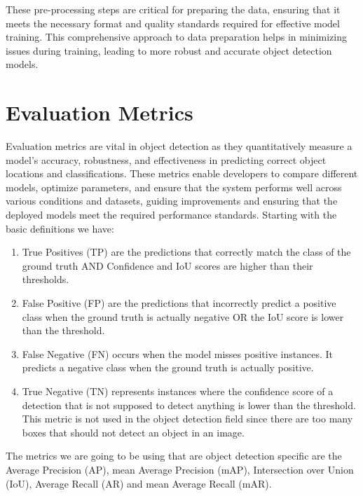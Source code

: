 These pre-processing steps are critical for preparing the data, ensuring that it meets the necessary format and quality standards required for effective 
model training. This comprehensive approach to data preparation helps in minimizing issues during training, leading to more robust and accurate object 
detection models.



\section{Evaluation Metrics}


Evaluation metrics are vital in object detection as they quantitatively measure a model's accuracy, robustness, and effectiveness in predicting correct 
object locations and classifications. These metrics enable developers to compare different models, optimize parameters, and ensure that the system performs 
well across various conditions and datasets, guiding improvements and ensuring that the deployed models meet the required performance standards. Starting 
with the basic definitions we have:

\begin{enumerate}
    \item True Positives (TP) \cite{metrics} are the predictions that correctly match the class of the ground truth AND Confidence and IoU scores are 
    higher than their thresholds.
    \item False Positive (FP) \cite{metrics} are the predictions that incorrectly predict a positive class when the ground truth is actually negative 
    OR the IoU score is lower than the threshold.
    \item False Negative (FN) \cite{metrics} occurs when the model misses positive instances. It predicts a negative class when the ground truth is actually positive.
    \item True Negative (TN) \cite{metrics} represents instances where the confidence score of a detection that is not supposed to detect anything is lower than 
    the threshold. This metric is not used in the object detection field since there are too many boxes that should not detect an object in an image.
\end{enumerate}


The metrics we are going to be using that are object detection specific are the Average Precision (AP), mean Average Precision (mAP), Intersection over 
Union (IoU), Average Recall (AR) and mean Average Recall (mAR). \\


